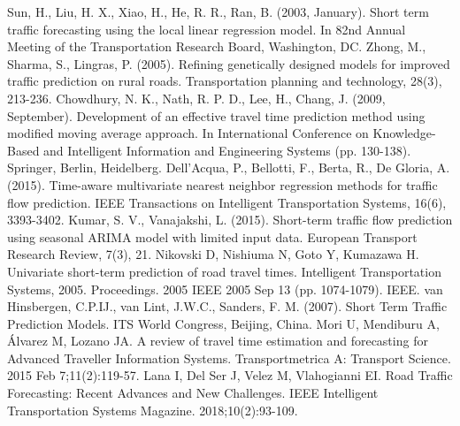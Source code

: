 \documentclass[conference, letterpaper]{IEEEtran}
\begin{document}
\begin{thebibliography}{00}
 Sun, H., Liu, H. X., Xiao, H., He, R. R., Ran, B. (2003, January). Short term traffic forecasting using the local linear regression model. In 82nd Annual Meeting of the Transportation Research Board, Washington, DC.
 Zhong, M., Sharma, S., Lingras, P. (2005). Refining genetically designed models for improved traffic prediction on rural roads. Transportation planning and technology, 28(3), 213-236.
 Chowdhury, N. K., Nath, R. P. D., Lee, H., Chang, J. (2009, September). Development of an effective travel time prediction method using modified moving average approach. In International Conference on Knowledge-Based and Intelligent Information and Engineering Systems (pp. 130-138). Springer, Berlin, Heidelberg.
 Dell'Acqua, P., Bellotti, F., Berta, R., De Gloria, A. (2015). Time-aware multivariate nearest neighbor regression methods for traffic flow prediction. IEEE Transactions on Intelligent Transportation Systems, 16(6), 3393-3402.
 Kumar, S. V., Vanajakshi, L. (2015). Short-term traffic flow prediction using seasonal ARIMA model with limited input data. European Transport Research Review, 7(3), 21.
 Nikovski D, Nishiuma N, Goto Y, Kumazawa H. Univariate short-term prediction of road travel times. Intelligent Transportation Systems, 2005. Proceedings. 2005 IEEE 2005 Sep 13 (pp. 1074-1079). IEEE.
 van Hinsbergen, C.P.IJ., van Lint, J.W.C.,  Sanders, F. M. (2007). Short Term Traffic Prediction Models. ITS World Congress, Beijing, China.
 Mori U, Mendiburu A, Álvarez M, Lozano JA. A review of travel time estimation and forecasting for Advanced Traveller Information Systems. Transportmetrica A: Transport Science. 2015 Feb 7;11(2):119-57.
 Lana I, Del Ser J, Velez M, Vlahogianni EI. Road Traffic Forecasting: Recent Advances and New Challenges. IEEE Intelligent Transportation Systems Magazine. 2018;10(2):93-109.
\end{thebibliography}
\end{document}
